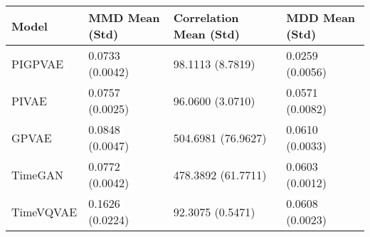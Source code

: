 \begin{tabular}{llll}
\toprule
Model & MMD Mean (Std) & Correlation Mean (Std) & MDD Mean (Std) \\
\midrule
PIGPVAE & 0.0733 (0.0042) & 98.1113 (8.7819) & 0.0259 (0.0056) \\
PIVAE & 0.0757 (0.0025) & 96.0600 (3.0710) & 0.0571 (0.0082) \\
GPVAE & 0.0848 (0.0047) & 504.6981 (76.9627) & 0.0610 (0.0033) \\
TimeGAN & 0.0772 (0.0042) & 478.3892 (61.7711) & 0.0603 (0.0012) \\
TimeVQVAE & 0.1626 (0.0224) & 92.3075 (0.5471) & 0.0608 (0.0023) \\
\bottomrule
\end{tabular}
